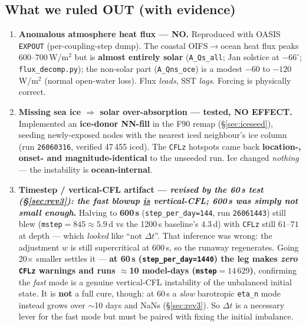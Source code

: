 \documentclass[11pt,a4paper]{article}
\newcommand{\code}[1]{\texttt{\small #1}}
\newcommand{\file}[1]{\texttt{\footnotesize #1}}
\begin{document}
\subsection{What we ruled OUT (with evidence)}
\begin{enumerate}[leftmargin=1.6em,itemsep=3pt]
  \item \textbf{Anomalous atmosphere heat flux --- NO.} Reproduced with OASIS \code{EXPOUT}
        (per-coupling-step dump). The coastal OIFS$\to$ocean heat flux peaks
        $600$--$700$\,W/m$^2$ but is \textbf{almost entirely solar} (\code{A\_Qs\_all};
        Jan solstice at $-66^\circ$; \file{flux\_decomp.py}); the non-solar part
        (\code{A\_Qns\_oce}) is a modest $-60$ to $-120$\,W/m$^2$ (normal open-water loss).
        Flux \emph{leads}, SST \emph{lags}. Forcing is physically correct.
  \item \textbf{Missing sea ice $\Rightarrow$ solar over-absorption --- tested, NO EFFECT.}
        Implemented an \textbf{ice-donor NN-fill} in the F90 remap (\S\ref{sec:iceseed}),
        seeding newly-exposed nodes with the nearest iced neighbour's ice column (run
        \code{26060316}, verified 47\,455 iced). The \code{CFLz} hotspots came back
        \textbf{location-, onset- and magnitude-identical} to the unseeded run. Ice changed
        \emph{nothing} --- the instability is \textbf{ocean-internal}.
  \item \textbf{Timestep / vertical-CFL artifact --- \emph{revised by the 60\,s test
        (\S\ref{sec:rev3}): the fast blowup \underline{is} vertical-CFL; 600\,s was simply not
        small enough}.} Halving to \textbf{600\,s} (\code{step\_per\_day=144}, run
        \code{26061443}) still blew (\code{mstep}$=845\approx5.9$\,d vs the 1200\,s baseline's
        $4.3$\,d) with \code{CFLz} still $61$--$71$ at depth --- which \emph{looked} like ``not
        $\Delta t$''. That inference was wrong: the adjustment $w$ is still supercritical at
        600\,s, so the runaway regenerates. Going 20$\times$ smaller settles it ---
        \textbf{at 60\,s (\code{step\_per\_day=1440}) the leg makes \emph{zero} \code{CFLz}
        warnings and runs $\approx$10 model-days (\code{mstep}$=14\,629$)}, confirming the
        \emph{fast} mode is a genuine vertical-CFL instability of the unbalanced initial state.
        It is \textbf{not} a full cure, though: at 60\,s a \emph{slow} barotropic \code{eta\_n}
        mode instead grows over $\sim$10 days and NaNs (\S\ref{sec:rev3}). So $\Delta t$ is a
        necessary lever for the fast mode but must be paired with fixing the initial imbalance.

\end{enumerate}
\end{document}
